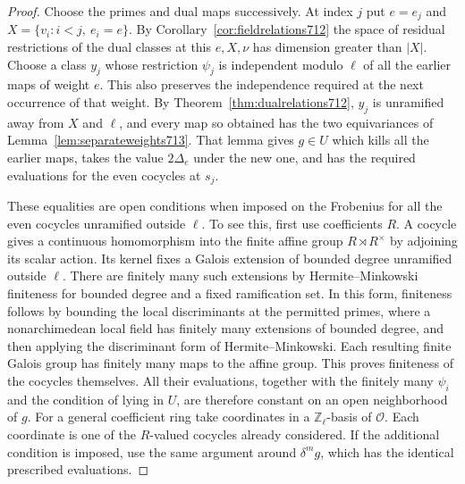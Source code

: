 \documentclass[a4paper,11pt]{article}
\theoremstyle{definition}
\theoremstyle{remark}
\newcommand{\ZZ}{\mathbb Z}\newcommand{\ord}{\operatorname{ord}}
\numberwithin{equation}{section}
\begin{document}
\begin{proof}
Choose the primes and dual maps successively. At index \(j\)
put \(e=e_j\) and \(X=\{v_i:i<j,\ e_i=e\}\). By
Corollary~\ref{cor:fieldrelations712} the space of residual
restrictions of the dual classes at this \(e,X,\nu\) has
dimension greater than \(|X|\). Choose a class \(y_j\) whose
restriction \(\psi_j\) is independent modulo \(\ell\) of all
the earlier maps of weight \(e\). This also preserves the
independence required at the next occurrence of that weight.
By Theorem~\ref{thm:dualrelations712}, \(y_j\) is unramified
away from \(X\) and \(\ell\), and every map so obtained has
the two equivariances of Lemma~\ref{lem:separateweights713}.
That lemma gives \(g\in U\) which kills all the earlier maps,
takes the value \(2\Delta_e\) under the new one, and has the
required evaluations for the even cocycles at \(s_j\).

These equalities are open conditions when imposed on the
Frobenius for all the even cocycles unramified outside \(\ell\).
To see this, first use coefficients \(R\). A cocycle gives a
continuous homomorphism into the finite affine group
\(R\rtimes R^\times\) by adjoining its scalar action. Its
kernel fixes a Galois extension of bounded degree unramified
outside \(\ell\). There are finitely many such extensions by
Hermite--Minkowski finiteness for bounded degree and a fixed
ramification set. In this form, finiteness follows by bounding
the local discriminants at the permitted primes, where a
nonarchimedean local field has finitely many extensions of
bounded degree, and then applying the discriminant form of
Hermite--Minkowski. Each resulting finite Galois group has
finitely many maps to the affine group. This proves finiteness
of the cocycles themselves. All their evaluations, together
with the finitely many \(\psi_i\) and the condition of lying
in \(U\), are therefore constant on an open neighborhood of
\(g\). For a general coefficient ring take coordinates in a
\(\ZZ_\ell\)-basis of \(\mathcal O\). Each coordinate is one
of the \(R\)-valued cocycles already considered. If the
additional condition is imposed, use the same argument around
\(\delta^m g\), which has the identical prescribed evaluations.


\end{proof}
\end{document}
